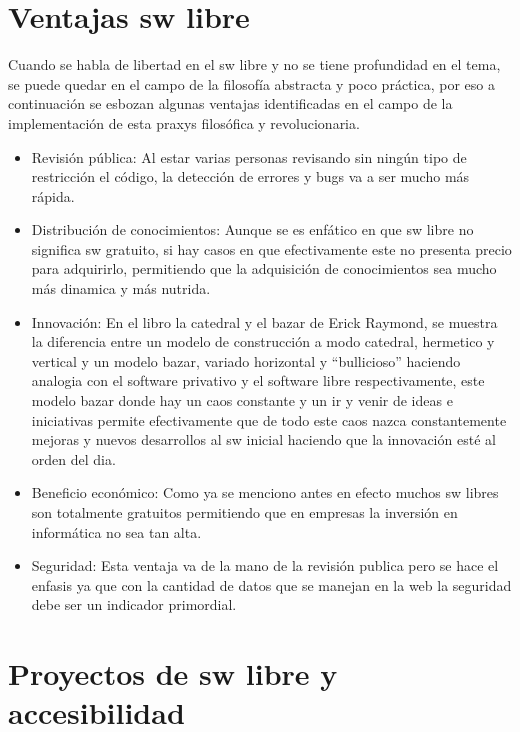\documentclass[a4paper]{article}
\begin{document}
\section{Ventajas sw libre}
Cuando se habla de libertad en el sw libre y no se tiene profundidad en el tema, se puede quedar en el campo de la filosofía abstracta y poco práctica, por eso a continuación se esbozan algunas ventajas identificadas en el campo de la implementación de esta praxys filosófica y revolucionaria.
\begin{itemize}
\item Revisión pública: Al estar varias personas revisando sin ningún tipo de restricción el código, la detección de errores y bugs va a ser mucho más rápida.
\item Distribución de conocimientos: Aunque se es enfático en que sw libre no significa sw gratuito, si hay casos en que efectivamente este no presenta precio para adquirirlo, permitiendo que la adquisición de conocimientos sea mucho más dinamica y más nutrida.
\item Innovación: En el libro la catedral y el bazar de Erick Raymond, se muestra la diferencia entre un modelo de construcción a modo catedral, hermetico y vertical y un modelo bazar, variado horizontal y “bullicioso” haciendo analogia con el software privativo y el software libre respectivamente, este modelo bazar donde hay un caos constante y un ir y venir de ideas e iniciativas permite efectivamente que de todo este caos nazca constantemente mejoras y nuevos desarrollos al sw inicial haciendo que la innovación esté al orden del dia.
\item Beneficio económico: Como ya se menciono antes en efecto muchos sw libres son totalmente gratuitos permitiendo que en empresas la inversión en informática no sea tan alta.
\item Seguridad: Esta ventaja va de la mano de la revisión publica pero se hace el enfasis ya que con la cantidad de datos que se manejan en la web la seguridad debe ser un indicador primordial.
\end{itemize}

\section{Proyectos de sw libre y accesibilidad}
\end{document}
